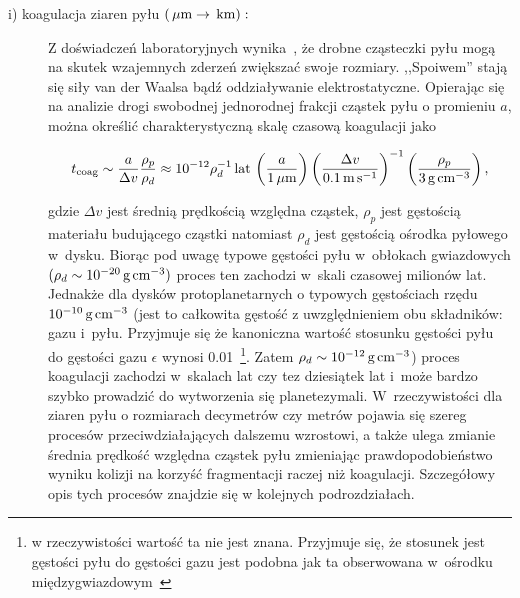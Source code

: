 \begin{description}
   \item[i) koagulacja ziaren pyłu $\left(\hbox{$\thinspace\mu\textrm{m}$} \rightarrow \hbox{$\thinspace\textrm{km}$}\right):$] 
      Z doświadczeń laboratoryjnych wynika~\cite{BW08}, że drob\-ne cząsteczki pyłu
      mogą na skutek wzajemnych zderzeń zwiększać swoje rozmiary. ,,Spoiwem'' stają
      się siły van der Waalsa bądź oddziaływanie elektrostatyczne. Opierając się
      na analizie drogi swobodnej jednorodnej frakcji cząstek pyłu o promieniu
      $a$, można określić charakterystyczną skalę czasową koagulacji jako 

   \begin{equation}\label{coag} 
      t_{\textrm{coag}} %
      \sim \frac{a}{\Delta v}\frac{\rho_p}{\rho_d} \approx 
      10^{-12} \rho_d^{-1}\yr\thinspace
      \left(\frac{a}{1\mum}\right)
      \left(\frac{\Delta v}{0.1\m\s^{-1}}\right)^{-1}
      \left(\frac{\rho_p}{3\g\cm^{-3}}\right),
   \end{equation}

   gdzie $\Delta v$ jest średnią prędkością względna cząstek, $\rho_p$ jest
   gęstością materiału budującego cząstki natomiast $\rho_d$ jest gęstością
   ośrodka pyłowego w~dysku.  Biorąc pod uwagę typowe gęstości pyłu w~obłokach
   gwiazdowych $(\rho_d \sim 10^{-20}\hbox{$\thinspace\textrm{g}$}\hbox{$\thinspace\textrm{cm}$}^{-3})$ proces ten zachodzi w~skali
   czasowej milionów lat. Jednakże dla dysków protoplanetarnych o typowych
   gęstościach rzędu $10^{-10}\hbox{$\thinspace\textrm{g}$}\hbox{$\thinspace\textrm{cm}$}^{-3}$ (jest to całkowita gęstość z
   uwzględnieniem obu składników: gazu i~pyłu. Przyjmuje się że kanoniczna
   wartość stosunku gęstości pyłu do gęstości gazu $\epsilon$ wynosi
   0.01~\footnote{w rzeczywistości wartość ta nie jest znana. Przyjmuje się, że
   stosunek jest gęstości pyłu do gęstości gazu jest podobna jak ta obserwowana
   w~ośrodku międzygwiazdowym~\cite{FS03}}. Zatem $\rho_d \sim
   10^{-12}\hbox{$\thinspace\textrm{g}$}\hbox{$\thinspace\textrm{cm}$}^{-3}$) proces koagulacji zachodzi w~skalach lat czy tez
   dziesiątek lat i~może bardzo szybko prowadzić do wytworzenia się
   planetezymali. W~rzeczywistości dla ziaren pyłu o rozmiarach decymetrów czy
   metrów pojawia się szereg procesów przeciwdziałających dalszemu wzrostowi, a
   także ulega zmianie średnia prędkość względna cząstek pyłu zmieniając
   prawdopodobieństwo wyniku kolizji na korzyść fragmentacji raczej niż
   koagulacji. Szczegółowy opis tych procesów znajdzie się w kolejnych
   podrozdziałach.


\end{description}
